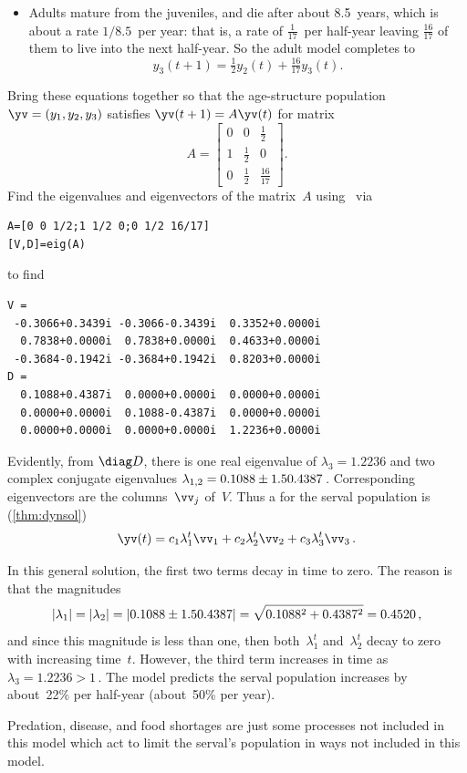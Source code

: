 \begin{example}
\begin{solution}
\begin{itemize}
\item Adults mature from the juveniles, and die after about 8.5~years, which is about a rate \(1/8.5\)~per year: that is, a rate of \(\frac1{17}\)~per half-year leaving \(\tfrac{16}{17}\) of them to live into the next half-year.
So the adult model completes to 
\begin{equation*}
y_3(t+1)=\tfrac12y_2(t)+\tfrac{16}{17}y_3(t).
\end{equation*}

\end{itemize}

Bring these equations together so that the age-structure population \(\yv=(y_1,y_2,y_3)\) satisfies \(\yv(t+1)=A\yv(t)\) for matrix
\begin{equation*}
A=\begin{bmatrix} 0&0&\frac1{2}
\\1&\frac12&0
\\0&\frac12&\frac{16}{17} \end{bmatrix}.
\end{equation*}
Find the eigenvalues and eigenvectors of the matrix~\(A\) using \script\ via
\begin{verbatim}
A=[0 0 1/2;1 1/2 0;0 1/2 16/17]
[V,D]=eig(A)
\end{verbatim}
\setbox\ajrqrbox\hbox{}%
\marginajrbox%
to find
\begin{verbatim}
V =
 -0.3066+0.3439i -0.3066-0.3439i  0.3352+0.0000i
  0.7838+0.0000i  0.7838+0.0000i  0.4633+0.0000i
 -0.3684-0.1942i -0.3684+0.1942i  0.8203+0.0000i
D =
  0.1088+0.4387i  0.0000+0.0000i  0.0000+0.0000i
  0.0000+0.0000i  0.1088-0.4387i  0.0000+0.0000i
  0.0000+0.0000i  0.0000+0.0000i  1.2236+0.0000i
\end{verbatim}
Evidently, from \(\diag D\), there is one real eigenvalue of \(\lambda_3=1.2236\) and two complex conjugate eigenvalues \(\lambda_{1,2}=0.1088\pm 1.50.4387\)\,.
Corresponding eigenvectors are the columns~\(\vv_j\) of~\(V\).
Thus a  for the serval population is (\cref{thm:dynsol})
\begin{equation*}
\yv(t)=c_1\lambda_1^t\vv_1+c_2\lambda_2^t\vv_2+c_3\lambda_3^t\vv_3\,.
\end{equation*}

In this general solution, the first two terms decay in time to zero.
The reason is that the magnitudes \begin{equation*}
|\lambda_1|=|\lambda_2|=|0.1088\pm 1.50.4387|=\sqrt{0.1088^2+0.4387^2}=0.4520\,,
\end{equation*} 
and since this magnitude is less than one, then both~\(\lambda_1^t\) and~\(\lambda_2^t\) decay to zero with increasing time~\(t\).
However, the third term increases in time as \(\lambda_3=1.2236>1\)\,.
The model predicts the serval population increases by about~22\% per half-year (about~50\% per year).
\end{solution} 
Predation, disease, and food shortages are just some processes not included in this model which act to limit the serval's population in ways not included in this model.
\end{example}


